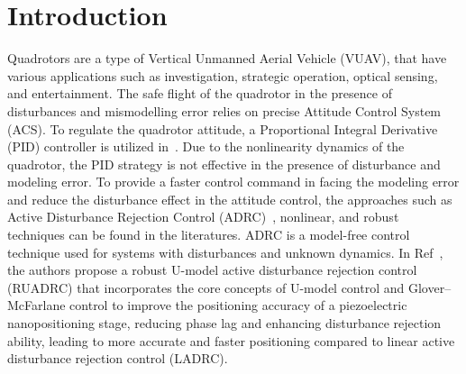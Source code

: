 \documentclass[3p]{elsarticle}
\begin{document}
\section{Introduction}\label{sec:intro}

\noindent Quadrotors are a type of Vertical Unmanned Aerial Vehicle (VUAV), that have various applications such as investigation, strategic operation, optical sensing, and entertainment. The safe flight of the quadrotor in the presence of disturbances and mismodelling error relies on precise Attitude Control System (ACS). To regulate the quadrotor attitude, a Proportional Integral Derivative (PID) controller is utilized in~\cite{article_Abdul, article_Bolandi}. Due to the nonlinearity dynamics of the quadrotor, the PID strategy is not effective in the presence of disturbance and modeling error. To provide a faster control command in facing the modeling error and reduce the disturbance effect in the attitude control, the approaches such as Active Disturbance Rejection Control (ADRC)~\cite{CHENG2023}, nonlinear, and robust~\cite{DING2022580, CORTESROMERO202063} techniques can be found in the literatures. ADRC is a model-free control technique used for systems with disturbances and unknown dynamics. In Ref~\cite{WEI2022599}, the authors propose a robust U-model active disturbance rejection control (RUADRC) that incorporates the core concepts of U-model control and Glover–McFarlane control to improve the positioning accuracy of a piezoelectric nanopositioning stage, reducing phase lag and enhancing disturbance rejection ability, leading to more accurate and faster positioning compared to linear active disturbance rejection control (LADRC). 
\end{document}
